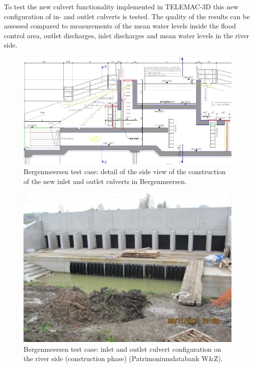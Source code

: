 To test the new culvert functionality implemented in TELEMAC-3D this new configuration of in- and outlet culverts is tested. 
The quality of the results can be assessed compared to measurements of the mean water levels inside the flood control area, 
outlet discharges, inlet discharges and mean water levels in the river side. 

\begin{figure}[H]
\begin{center}
  \includegraphics[scale=0.5]{figure1.png}
\end{center}
\caption{Bergenmeersen test case: detail of the side view of 
the construction of the new inlet and outlet culverts in Bergenmeersen.}
\label{fig:bergenmeersen_figure1}
\end{figure}

\begin{figure}[H]
\begin{center}
  \includegraphics[scale=1.0]{figure2.png}
\end{center}
\caption{Bergenmeersen test case: inlet and outlet culvert configuration on the river side (construction phase) (Patrimoniumdatabank W\&Z).}
\label{fig:bergenmeersen_figure2}
\end{figure}

